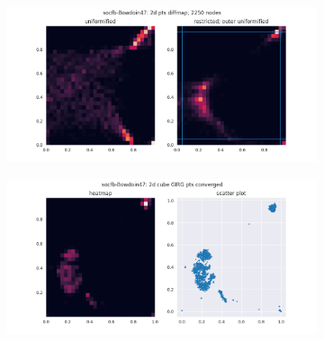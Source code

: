 \begin{figure}
  \begin{subfigure}{\textwidth}
    \centering
    \includegraphics[width=\linewidth]{figures/socfb-Bowdoin47_2ddiffmap_unif_vs_restrict.png}
  \end{subfigure}

  \vspace{1em}
  \begin{subfigure}{\textwidth}
    \centering
    \includegraphics[width=\linewidth]{figures/socfb-Bowdoin47_2d_cube_GIRG_converged.png}
  \end{subfigure}

\end{figure}



